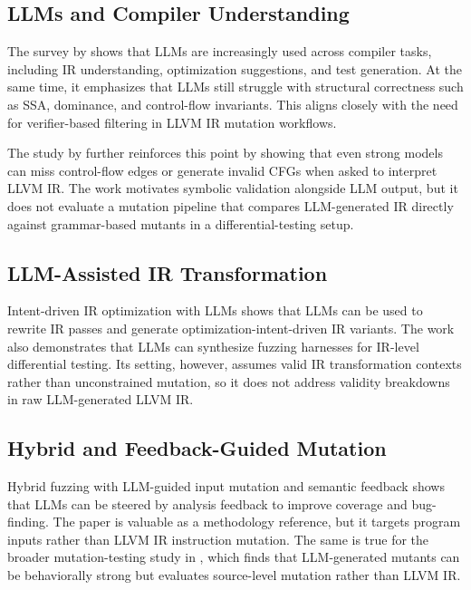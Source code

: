 \documentclass[journal]{IEEEtran}
\begin{document}
\subsection{LLMs and Compiler Understanding}

The survey by \cite{llm_compilers_survey} shows that LLMs are increasingly used across compiler tasks, including IR understanding, optimization suggestions, and test generation. At the same time, it emphasizes that LLMs still struggle with structural correctness such as SSA, dominance, and control-flow invariants. This aligns closely with the need for verifier-based filtering in LLVM IR mutation workflows.

The study by \cite{llms_understand_ir} further reinforces this point by showing that even strong models can miss control-flow edges or generate invalid CFGs when asked to interpret LLVM IR. The work motivates symbolic validation alongside LLM output, but it does not evaluate a mutation pipeline that compares LLM-generated IR directly against grammar-based mutants in a differential-testing setup.

\subsection{LLM-Assisted IR Transformation}

Intent-driven IR optimization with LLMs \cite{intent_driven_ir} shows that LLMs can be used to rewrite IR passes and generate optimization-intent-driven IR variants. The work also demonstrates that LLMs can synthesize fuzzing harnesses for IR-level differential testing. Its setting, however, assumes valid IR transformation contexts rather than unconstrained mutation, so it does not address validity breakdowns in raw LLM-generated LLVM IR.

\subsection{Hybrid and Feedback-Guided Mutation}

Hybrid fuzzing with LLM-guided input mutation and semantic feedback \cite{hybrid_fuzzing} shows that LLMs can be steered by analysis feedback to improve coverage and bug-finding. The paper is valuable as a methodology reference, but it targets program inputs rather than LLVM IR instruction mutation. The same is true for the broader mutation-testing study in \cite{llm_mutation_testing}, which finds that LLM-generated mutants can be behaviorally strong but evaluates source-level mutation rather than LLVM IR.
\end{document}

